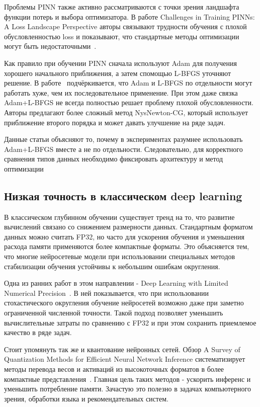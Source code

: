 \documentclass[14pt,a4paper]{extarticle}
\begin{document}
Проблемы PINN также активно рассматриваются с точки зрения ландшафта функции потерь и выбора оптимизатора. В работе Challenges in Training PINNs: A Loss Landscape Perspective авторы связывают трудности обучения с плохой обусловленностью loss и показывают, что стандартные методы оптимизации могут быть недостаточными~\cite{rathore2024challenges}.

Как правило при обучении PINN сначала используют Adam для получения хорошего начального приближения, а затем спомощью L-BFGS уточняют решение.  В работе~\cite{rathore2024challenges} подчёркивается, что Adam и L-BFGS по отдельности могут работать хуже, чем их последовательное применение. При этом даже связка Adam+L-BFGS не всегда полностью решает проблему плохой обусловленности. Авторы предлагают более сложный метод NysNewton-CG, который использует приближение второго порядка и может давать улучшение на ряде задач.

Данные статьи объясняют то, почему в экспериментах разумнее использовать Adam+L-BFGS вместе а не по отдельности. Следовательно, для корректного сравнения типов данных необходимо фиксировать архитектуру и метод оптимизации

\subsection{Низкая точность в классическом deep learning}

В классическом глубинном обучении существует тренд на то, что развитие вычислений связано со снижением размерности данных. Стандартным форматом данных можно считать FP32, но часто для ускорения обучения и уменьшения расхода памяти применяются более компактные форматы. Это объясняется тем, что многие нейросетевые модели при использовании специальных методов стабилизации обучения устойчивы к небольшим ошибкам округления.

Одна из ранних работ в этом направлении - Deep Learning with Limited Numerical Precision~\cite{gupta2015limited}. В ней показывается, что при использовании стохастического округления обучение нейросетей возможно даже при заметно ограниченной численной точности. Такой подход позволяет уменьшить вычислительные затраты по сравнению с FP32 и при этом сохранить приемлемое качество в ряде задач.

Стоит упомянуть так же и квантование нейронных сетей. Обзор A Survey of Quantization Methods for Efficient Neural Network Inference систематизирует методы перевода весов и активаций из высокоточных форматов в более компактные представления~\cite{gholami2021survey}. Главная цель таких методов - ускорить инференс и уменьшить потребление памяти. Зачастую это полезно в задачах компьютерного зрения, обработки языка и рекомендательных систем.
\end{document}
